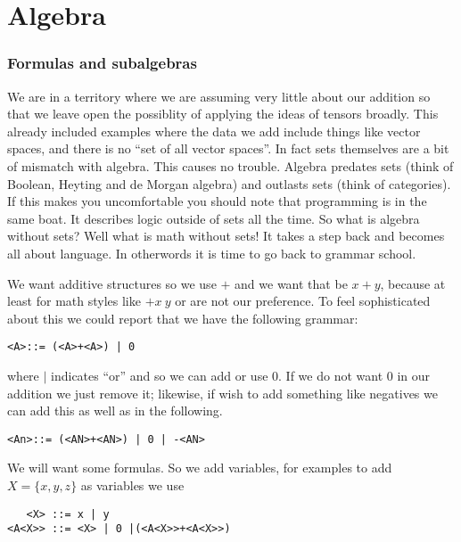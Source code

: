 \chapter{Algebra}\label{app:algebra}
\subsection{Formulas and subalgebras}
We are in a territory where we are assuming very little about our addition 
so that we leave open the possiblity of applying the ideas of tensors broadly.
This already included examples where the data we add include things like vector spaces,
and there is no ``set of all vector spaces''.  In fact sets themselves are a bit 
of mismatch with algebra.  This causes no trouble.  Algebra predates sets 
(think of Boolean, Heyting and de Morgan algebra) and outlasts sets (think 
of categories).  If this makes you uncomfortable you should note that programming 
is in the same boat.  It describes logic outside of sets all the time.
So what is algebra without sets?  Well what is math without sets! 
It takes a step back and becomes all about language.  In otherwords 
it is time to go back to grammar school.

We want additive structures so we use $+$ and we want that be $x+y$, because 
at least for math 
styles like $+x~y$ or  are not our preference.
To feel sophisticated about this we could report that we have the following 
grammar:
\begin{center}
\begin{lstlisting}
<A>::= (<A>+<A>) | 0
\end{lstlisting}   
\end{center}
where $|$ indicates ``or'' and so we can add or use $0$.  If we do not want 
$0$ in our addition we just remove it; likewise, if wish to add something like 
negatives we can add this as well as in the following.
\begin{center}
\begin{lstlisting}
<An>::= (<AN>+<AN>) | 0 | -<AN>
\end{lstlisting}   
\end{center}


We will want some formulas.  So we add variables, 
for examples to add $X=\{x,y,z\}$ as variables we use
\begin{center}
\begin{lstlisting}
   <X> ::= x | y 
<A<X>> ::= <X> | 0 |(<A<X>>+<A<X>>)      
\end{lstlisting}
\end{center}



